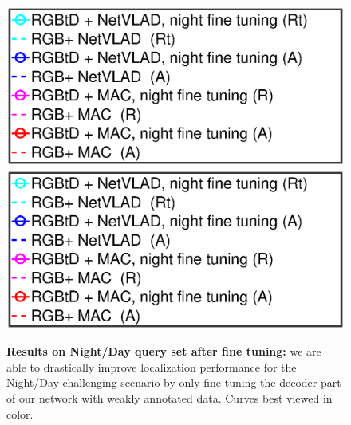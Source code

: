 \begin{figure}
	\includegraphics[trim={108 160 205 335},clip,width=0.4\linewidth]{plot/fig/legend_night_corr}\hspace{0.1cm}
	\includegraphics[trim={108 60 205 430},clip,width=0.4\linewidth]{plot/fig/legend_night_corr}
	\caption{\label{fig:ft_night} \textbf{Results on Night/Day query set after fine tuning:} we are able to drastically improve localization performance for the Night/Day challenging scenario by only fine tuning the decoder part of our network with weakly annotated data. Curves best viewed in color.}
	\vspace{-0.25cm}
\end{figure}
